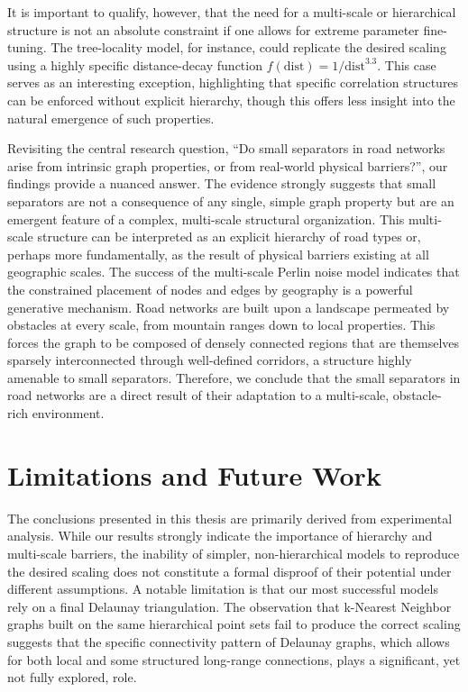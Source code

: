It is important to qualify, however, that the need for a multi-scale or hierarchical structure is not an absolute constraint if one allows for extreme parameter fine-tuning.
The tree-locality model, for instance, could replicate the desired scaling using a highly specific distance-decay function \(f(\text{dist}) = 1/\text{dist}^{3.3}\).
This case serves as an interesting exception, highlighting that specific correlation structures can be enforced without explicit hierarchy, though this offers less insight into the natural emergence of such properties.

Revisiting the central research question, \enquote{Do small separators in road networks arise from intrinsic graph properties, or from real-world physical barriers?}, our findings provide a nuanced answer.
The evidence strongly suggests that small separators are not a consequence of any single, simple graph property but are an emergent feature of a complex, multi-scale structural organization.
This multi-scale structure can be interpreted as an explicit hierarchy of road types or, perhaps more fundamentally, as the result of physical barriers existing at all geographic scales.
The success of the multi-scale Perlin noise model indicates that the constrained placement of nodes and edges by geography is a powerful generative mechanism.
Road networks are built upon a landscape permeated by obstacles at every scale, from mountain ranges down to local properties.
This forces the graph to be composed of densely connected regions that are themselves sparsely interconnected through well-defined corridors, a structure highly amenable to small separators.
Therefore, we conclude that the small separators in road networks are a direct result of their adaptation to a multi-scale, obstacle-rich environment.

\section{Limitations and Future Work}
\label{sec:conclusion:future_work}

The conclusions presented in this thesis are primarily derived from experimental analysis.
While our results strongly indicate the importance of hierarchy and multi-scale barriers, the inability of simpler, non-hierarchical models to reproduce the desired scaling does not constitute a formal disproof of their potential under different assumptions.
A notable limitation is that our most successful models rely on a final Delaunay triangulation.
The observation that k-Nearest Neighbor graphs built on the same hierarchical point sets fail to produce the correct scaling suggests that the specific connectivity pattern of Delaunay graphs, which allows for both local and some structured long-range connections, plays a significant, yet not fully explored, role.

